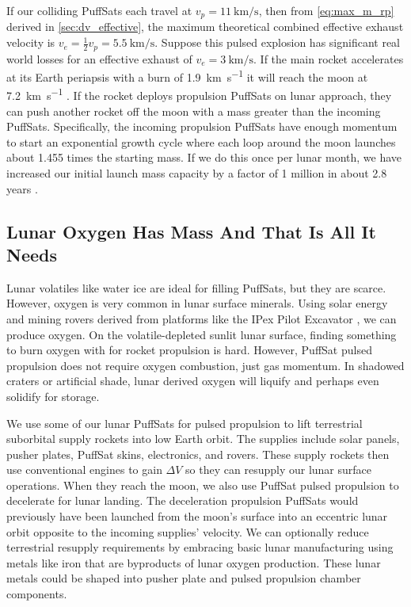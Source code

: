 \documentclass{article}
\begin{document}
{If our colliding PuffSats each travel at $v_p=\SI{11}{\kilo\meter\per\second}$, then from \autoref{eq:max_m_rp} derived in \autoref{sec:dv_effective},  the maximum theoretical combined effective exhaust velocity is $v_e = \frac{1}{2}v_p = \SI {5.5}{\kilo\meter\per\second}$.  Suppose this pulsed explosion has significant real world losses for an effective exhaust of $v_e = \SI{3}{\kilo\meter\per\second}$.   If the main rocket accelerates at its Earth periapsis with a burn of \SI{1.9}{\kilo\meter\per\second} it will reach the moon at \SI{7.2}{\kilo\meter\per\second} \cite{Katz_aim_is_all_you_need_2025}.   If the rocket deploys propulsion PuffSats on lunar approach, they can push another rocket off the moon with a mass greater than the incoming PuffSats. Specifically, the incoming propulsion PuffSats have enough momentum to start an exponential growth cycle where each loop around the moon launches about 1.455 times the starting mass.   If we do this once per lunar month, we have increased our initial launch mass capacity by a factor of 1 million in about 2.8 years \cite{Katz_aim_is_all_you_need_2025}. 

\subsection{Lunar Oxygen Has Mass And That Is All It Needs}\label{sec:lunar_mining}
Lunar volatiles like water ice are ideal for filling PuffSats, but they are scarce.   However, oxygen is very common in lunar surface minerals.   Using solar energy and mining rovers derived from platforms like the IPex Pilot Excavator \cite{ipex_pilot_excavator}, we can produce oxygen.  On the volatile-depleted sunlit lunar surface, finding something to burn oxygen with for rocket propulsion is hard.   However, PuffSat pulsed propulsion does not require oxygen combustion, just gas momentum.  In shadowed craters or artificial shade, lunar derived oxygen will liquify and perhaps even solidify for storage.  

We use some of our lunar PuffSats for pulsed propulsion to lift terrestrial suborbital supply rockets into low Earth orbit.  The supplies include solar panels, pusher plates, PuffSat skins, electronics, and rovers. These supply rockets then use conventional engines to gain \(\Delta V\) so they can resupply our lunar surface operations.   When they reach the moon, we also use PuffSat pulsed propulsion to decelerate for lunar landing.  The deceleration propulsion PuffSats would previously have been launched from the moon's surface into an eccentric lunar orbit opposite to the incoming supplies' velocity.   We can optionally reduce terrestrial resupply requirements by embracing basic lunar manufacturing using metals like iron that are byproducts of lunar oxygen production.  These lunar metals could be shaped into pusher plate and pulsed propulsion chamber components.  

}
\end{document}
